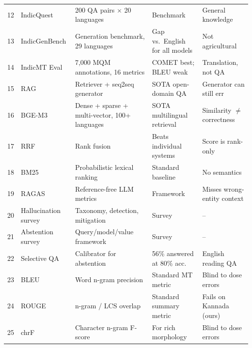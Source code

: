 \begin{small}
\begin{longtable}{p{0.4cm}p{3.0cm}p{3.6cm}p{3.2cm}p{3.6cm}}
12 & IndicQuest \cite{rohera2024indicquest} & 200 QA pairs $\times$ 20 languages & Benchmark & General knowledge\\
13 & IndicGenBench \cite{singh2024indicgenbench} & Generation benchmark, 29 languages & Gap vs.\ English for all models & Not agricultural\\
14 & IndicMT Eval \cite{sai2023indicmteval} & 7,000 MQM annotations, 16 metrics & COMET best; BLEU weak & Translation, not QA\\
15 & RAG \cite{lewis2020rag} & Retriever + seq2seq generator & SOTA open-domain QA & Generator can still err\\
16 & BGE-M3 \cite{chen2024bgem3} & Dense + sparse + multi-vector, 100+ languages & SOTA multilingual retrieval & Similarity $\neq$ correctness\\
17 & RRF \cite{cormack2009rrf} & Rank fusion & Beats individual systems & Score is rank-only\\
18 & BM25 \cite{robertson2009bm25} & Probabilistic lexical ranking & Standard baseline & No semantics\\
19 & RAGAS \cite{es2023ragas} & Reference-free LLM metrics & Framework & Misses wrong-entity context\\
20 & Hallucination survey \cite{huang2024hallucination} & Taxonomy, detection, mitigation & Survey & --\\
21 & Abstention survey \cite{wen2025abstention} & Query/model/value framework & Survey & --\\
22 & Selective QA \cite{kamath2020selective} & Calibrator for abstention & 56\% answered at 80\% acc. & English reading QA\\
23 & BLEU \cite{papineni2002bleu} & Word n-gram precision & Standard MT metric & Blind to dose errors\\
24 & ROUGE \cite{lin2004rouge} & n-gram / LCS overlap & Standard summary metric & Fails on Kannada (ours)\\
25 & chrF \cite{popovic2015chrf} & Character n-gram F-score & For rich morphology & Blind to dose errors\\
\bottomrule
\end{longtable}
\end{small}


